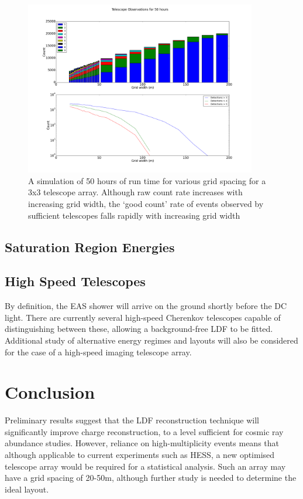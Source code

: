 \documentclass{article}
\begin{document}
\begin{figure}
\begin{center}
\includegraphics[width=0.9\textwidth]{optimiselayout}
\caption{A simulation of 50 hours of run time for various grid spacing for a 3x3 telescope array. Although raw count rate increases with increasing grid width, the \textquoteleft good count' rate of events observed by sufficient telescopes falls rapidly with increasing grid width}
\label{fig:optmiselayout}
\end{center}
\end{figure}

\subsection{Saturation Region Energies}

\subsection{High Speed Telescopes}
By definition, the EAS shower will arrive on the ground shortly before the DC light. There are currently several high-speed Cherenkov telescopes capable of distinguishing between these, allowing a background-free LDF to be fitted. Additional study of alternative energy regimes and layouts will also be considered for the case of a high-speed imaging telescope array. 

\section{Conclusion}
Preliminary results suggest that the LDF reconstruction technique will significantly improve charge reconstruction, to a level sufficient for cosmic ray abundance studies. However, reliance on high-multiplicity events means that although applicable to current experiments such as HESS, a new optimised telescope array would be required for a statistical analysis. Such an array may have a grid spacing of 20-50m, although further study is needed to determine the ideal layout.


\end{document}
